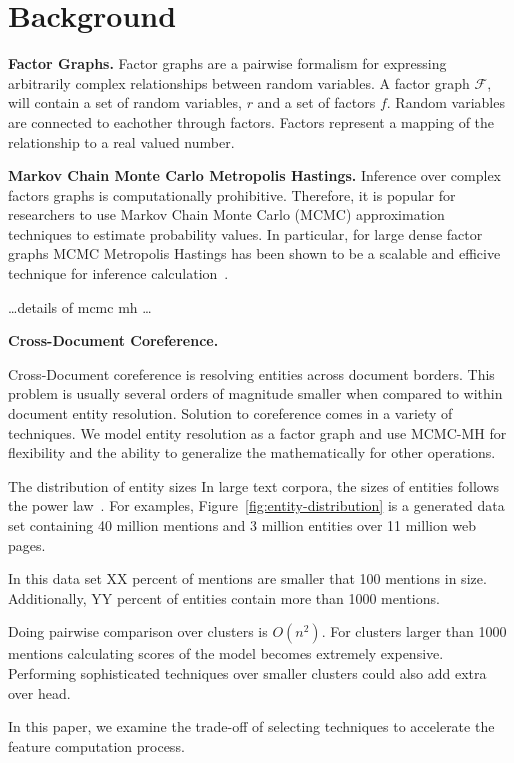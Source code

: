 
\section{Background}

\textbf{Factor Graphs.}
Factor graphs are a pairwise formalism for expressing arbitrarily complex
relationships between random variables.
A factor graph $\mathcal{F}$, will contain a set of random variables, $r$
and a set of factors $f$. Random variables are connected to eachother
through factors. Factors represent a mapping of the relationship to a 
real valued number.


\textbf{Markov Chain Monte Carlo Metropolis Hastings.}
Inference over complex factors graphs is computationally prohibitive.
Therefore, it is popular for researchers to use Markov Chain Monte Carlo (MCMC) 
approximation techniques to estimate probability values.
In particular, for large dense factor graphs MCMC Metropolis Hastings has
been shown to be a scalable and efficive technique for 
inference calculation~\cite{singh2011large}.

\ldots details of mcmc mh \ldots



\textbf{Cross-Document Coreference.}

Cross-Document coreference is resolving entities across document borders.
This problem is usually several orders of magnitude smaller when compared to within document entity resolution.
Solution to coreference comes in a variety of techniques.
We model entity resolution as a factor graph and use MCMC-MH for flexibility and the ability
to generalize the mathematically for other operations.

The distribution of entity sizes
In large text corpora, the sizes of entities follows the power law~\cite{singh12:wiki-links}.
For examples, Figure~\ref{fig:entity-distribution} is a generated data set containing
40 million mentions and 3 million entities over 11 million web pages.

In this data set XX percent of mentions are smaller that 100 mentions in size.
Additionally, YY percent of entities contain more than 1000 mentions.

Doing pairwise comparison over clusters is $O(n^2)$.
For clusters larger than 1000 mentions calculating scores of the model
becomes extremely expensive.
Performing sophisticated techniques over smaller clusters could also 
add extra over head.

In this paper, we examine the trade-off of selecting techniques to
accelerate the feature computation process.


